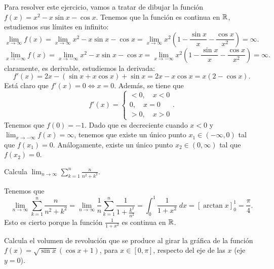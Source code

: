 \documentclass{article}
\begin{document}
\begin{sol}
Para resolver este ejercicio, vamos a tratar de dibujar la función $\displaystyle f\left(x\right) = x^{2}- x \sin x - \cos x $. Tenemos que la función es continua en $\displaystyle \mathbb{R} $, estudiemos sus límites en infinito:
\[\lim_{x \to \infty}f\left(x\right) = \lim_{x \to \infty}x^{2}-x \sin x - \cos x = \lim_{x \to \infty}x^{2}\left(1-\frac{\sin x }{x}-\frac{\cos x}{x^{2}}\right)= \infty .\]
\[\lim_{x \to -\infty}f\left(x\right) = \lim_{x \to -\infty}x^{2}-x\sin x - \cos x = \lim_{x \to -\infty}x^{2}\left(1-\frac{\sin x }{x}- \frac{\cos x}{x^{2}}\right) = \infty .\]
claramente, es derivable, estudiemos la derivada:
\[f'\left(x\right) = 2x - \left(\sin x + x\cos x\right)+\sin x=2x-x \cos x=x\left(2-\cos x\right) .\]
Está claro que $\displaystyle f'\left(x\right) = 0 \iff x = 0 $. Además, se tiene que
\[f'\left(x\right) = 
\begin{cases}
< 0, \quad x < 0 \\
0, \quad x = 0 \\
> 0, \quad x > 0
\end{cases}
.\]
Tenemos que $\displaystyle f\left(0\right) = -1 $. Dado que es decreciente cuando $\displaystyle x < 0 $ y $\displaystyle \lim_{x \to - \infty}f\left(x\right) = \infty $, tenemos que existe un único punto $\displaystyle x_{1} \in \left(-\infty, 0\right) $ tal que $\displaystyle f\left(x_{1}\right)=0 $. Análogamente, existe un único punto $\displaystyle x_{2} \in \left(0, \infty\right) $ tal que $\displaystyle f\left(x_{2}\right) = 0 $.
\end{sol}
\begin{ej}
Calcula $\displaystyle \lim_{n \to \infty}\sum^{n}_{k = 1}\frac{n}{n^{2}+k^{2}} $.
\end{ej}
\begin{sol}
Tenemos que
\[\lim_{n \to \infty}\sum^{n}_{k=1}\frac{n}{n^{2}+k^{2}}=\lim_{n \to \infty}\frac{1}{n}\sum^{n}_{k=1}\frac{1}{1+\frac{k^{2}}{n^{2}}}=\int^{1}_{0} \frac{1}{1+x^{2}} \; dx = \left[\arctan x\right] ^{1}_{0}=\frac{\pi }{4} .\]
Esto es cierto porque la función $\displaystyle \frac{1}{1+x^{2}} $ es continua en $\displaystyle \mathbb{R} $. 
\end{sol}
\begin{ej}
	Calcula el volumen de revolución que se produce al girar la gráfica de la función $\displaystyle f\left(x\right) = \sqrt{\sin x}\left(\cos x +1\right) $, para $\displaystyle x \in \left[0, \pi \right]  $, respecto del eje de las $\displaystyle x $ (eje $\displaystyle y = 0 $).
\end{ej}
\end{document}
